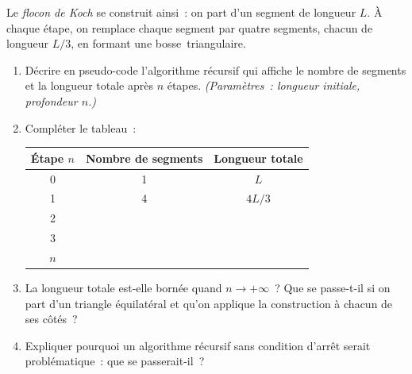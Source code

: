 \begin{challenge}
Le \emph{flocon de Koch} se construit ainsi~: on part d'un segment de longueur $L$.
\`A chaque \'etape, on remplace chaque segment par quatre segments,
chacun de longueur $L/3$, en formant une \og bosse\fg\ triangulaire.
\begin{enumerate}
  \item D\'ecrire en pseudo-code l'algorithme r\'ecursif qui affiche le nombre
        de segments et la longueur totale apr\`es $n$ \'etapes.
        \emph{(Param\`etres~: longueur initiale, profondeur $n$.)}
  \item Compl\'eter le tableau~:
        \begin{center}
        \renewcommand{\arraystretch}{1.3}
        \begin{tabular}{|c|c|c|}
        \hline
        \rowcolor{BN!10}
        \'Etape $n$ & Nombre de segments & Longueur totale \\
        \hline
        0 & 1 & $L$ \\
        1 & 4 & $4L/3$ \\
        2 & & \\
        3 & & \\
        $n$ & & \\
        \hline
        \end{tabular}
        \end{center}
  \item La longueur totale est-elle born\'ee quand $n\to+\infty$~?
        Que se passe-t-il si on part d'un triangle \'equilat\'eral
        et qu'on applique la construction \`a chacun de ses c\^ot\'es~?
  \item Expliquer pourquoi un algorithme r\'ecursif sans condition
        d'arr\^et serait probl\'ematique~: que se passerait-il~?
\end{enumerate}
\end{challenge}

